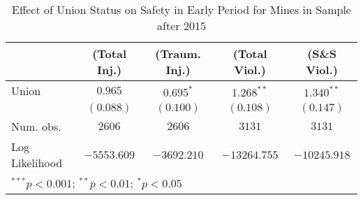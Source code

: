 
\begin{table}[H]
\begin{center}
\begin{tabular}{l c c c c}
\hline
 & (Total Inj.) & (Traum. Inj.) & (Total Viol.) & (S\&S Viol.) \\
\hline
Union          & $0.965$     & $0.695^{*}$ & $1.268^{**}$ & $1.340^{**}$ \\
               & $(0.088)$   & $(0.100)$   & $(0.108)$    & $(0.147)$    \\
\hline
Num. obs.      & $2606$      & $2606$      & $3131$       & $3131$       \\
Log Likelihood & $-5553.609$ & $-3692.210$ & $-13264.755$ & $-10245.918$ \\
\hline
\multicolumn{5}{l}{\scriptsize{$^{***}p<0.001$; $^{**}p<0.01$; $^{*}p<0.05$}}
\end{tabular}
\caption{Effect of Union Status on Safety in Early Period for Mines in Sample after 2015}
\label{irr_100employees_activelate}
\end{center}
\end{table}

